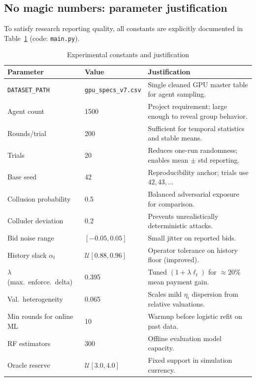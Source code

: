 \documentclass[journal]{IEEEtran}
\begin{document}
\subsection{No magic numbers: parameter justification}
To satisfy research reporting quality, all constants are explicitly documented in Table~\ref{tab:params} (code: \texttt{main.py}).
\begin{table}[t]
\centering
\caption{Experimental constants and justification}
\label{tab:params}
\begin{tabular}{p{} p{} p{}}
\toprule
\textbf{Parameter} & \textbf{Value} & \textbf{Justification} \\
\midrule
\texttt{DATASET\_PATH} & \texttt{gpu\_specs\_v7.csv} & Single cleaned GPU master table for agent sampling. \\
Agent count & 1500 & Project requirement; large enough to reveal group behavior. \\
Rounds/trial & 200 & Sufficient for temporal statistics and stable means. \\
Trials & 20 & Reduces one-run randomness; enables mean $\pm$ std reporting. \\
Base seed & 42 & Reproducibility anchor; trials use $42,43,\ldots$ \\
Collusion probability & 0.5 & Balanced adversarial exposure for comparison. \\
Colluder deviation & 0.2 & Prevents unrealistically deterministic attacks. \\
Bid noise range & $[-0.05,0.05]$ & Small jitter on reported bids. \\
History slack $\alpha_t$ & $\mathcal{U}[0.88,0.96]$ & Operator tolerance on history floor (improved). \\
$\lambda$ (max.\ enforce.\ delta) & 0.395 & Tuned $(1+\lambda\ell_t)$ for $\approx$20\% mean payment gain. \\
Val.\ heterogeneity & 0.065 & Scales mild $\eta_i$ dispersion from relative valuations. \\
Min rounds for online ML & 10 & Warmup before logistic refit on past data. \\
RF estimators & 300 & Offline evaluation model capacity. \\
Oracle reserve & $\mathcal{U}[3.0,4.0]$ & Fixed support in simulation currency. \\
\bottomrule
\end{tabular}
\end{table}
\end{document}
